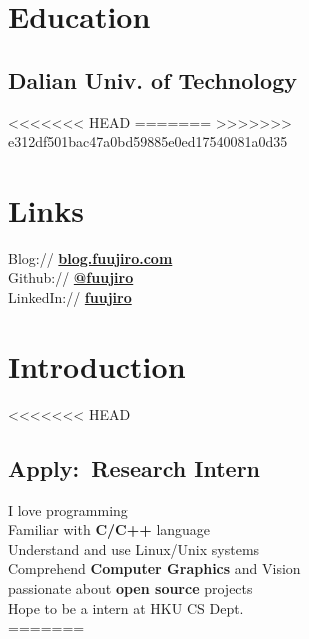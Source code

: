 \documentclass[]{deedy-resume-openfont}
\begin{document}
%
%
\lastupdated

%
%

%
%

\begin{minipage}[t]{0.25\textwidth} 


\section{Education} 

\subsection{Dalian Univ. of Technology}
<<<<<<< HEAD
=======
>>>>>>> e312df501bac47a0bd59885e0ed17540081a0d35
\sectionsep


\section{Links}
\sectionsep
Blog://  \href{https://blog.fuujiro.com/}{\bf blog.fuujiro.com} \\  
Github:// \href{https://github.com/fuujiro}{\bf @fuujiro} \\
LinkedIn://  \href{https://www.linkedin.com/in/fuujiro}{\bf fuujiro} \\


\section{Introduction}
<<<<<<< HEAD
\subsection{Apply:\  Research Intern}
I love programming \\
Familiar with \textbf{C/C++} language \\
Understand and use Linux/Unix systems \\
Comprehend \textbf{Computer Graphics} and Vision \\
passionate about \textbf{open source} projects \\
Hope to be a intern at HKU CS Dept. \\
=======

\end{minipage}
\end{document}
